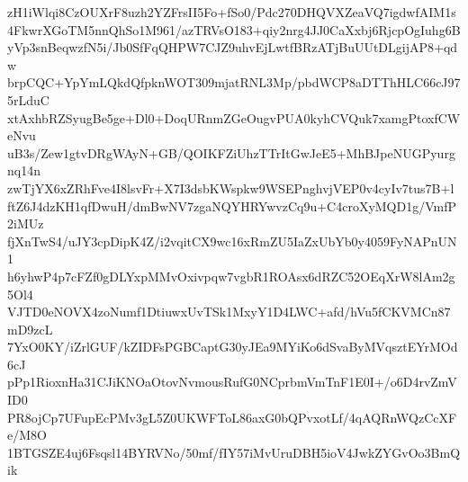 zH1iWlqi8CzOUXrF8uzh2YZFrsII5Fo+fSo0/Pdc270DHQVXZeaVQ7igdwfAIM1s
4FkwrXGoTM5nnQhSo1M961/azTRVsO183+qiy2nrg4JJ0CaXxbj6RjcpOgIuhg6B
yVp3snBeqwzfN5i/Jb0SfFqQHPW7CJZ9uhvEjLwtfBRzATjBuUUtDLgijAP8+qdw
brpCQC+YpYmLQkdQfpknWOT309mjatRNL3Mp/pbdWCP8aDTThHLC66cJ975rLduC
xtAxhbRZSyugBe5ge+Dl0+DoqURnmZGeOugvPUA0kyhCVQuk7xamgPtoxfCWeNvu
uB3s/Zew1gtvDRgWAyN+GB/QOIKFZiUhzTTrItGwJeE5+MhBJpeNUGPyurgnq14n
zwTjYX6xZRhFve4I8lsvFr+X7I3dsbKWspkw9WSEPnghvjVEP0v4cyIv7tus7B+l
ftZ6J4dzKH1qfDwuH/dmBwNV7zgaNQYHRYwvzCq9u+C4croXyMQD1g/VmfP2iMUz
fjXnTwS4/uJY3cpDipK4Z/i2vqitCX9wc16xRmZU5IaZxUbYb0y4059FyNAPnUN1
h6yhwP4p7cFZf0gDLYxpMMvOxivpqw7vgbR1ROAsx6dRZC52OEqXrW8lAm2g5Ol4
VJTD0eNOVX4zoNumf1DtiuwxUvTSk1MxyY1D4LWC+afd/hVu5fCKVMCn87mD9zcL
7YxO0KY/iZrlGUF/kZIDFsPGBCaptG30yJEa9MYiKo6dSvaByMVqsztEYrMOd6cJ
pPp1RioxnHa31CJiKNOaOtovNvmousRufG0NCprbmVmTnF1E0I+/o6D4rvZmVID0
PR8ojCp7UFupEcPMv3gL5Z0UKWFToL86axG0bQPvxotLf/4qAQRnWQzCcXFe/M8O
1BTGSZE4uj6Fsqsl14BYRVNo/50mf/fIY57iMvUruDBH5ioV4JwkZYGvOo3BmQik
